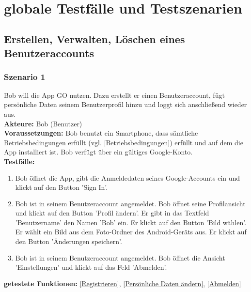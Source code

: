 \documentclass[parskip=full]{scrartcl}
\def\threedigits#1{%
  \ifnum#1<100 0\fi
  \ifnum#1<10 0\fi
  \number#1}
\begin{document}

\newpage
\section{globale Testfälle und Testszenarien}

\subsection{Erstellen, Verwalten, Löschen eines Benutzeraccounts}

\subsubsection*{Szenario 1}Bob will die App GO nutzen. Dazu erstellt er einen Benutzeraccount, fügt persönliche Daten seinem Benutzerprofil hinzu und loggt sich anschließend wieder aus.\\

\textbf{Akteure:} Bob (Benutzer) \\

\textbf{Voraussetzungen: }Bob benutzt ein Smartphone, dass sämtliche Betriebsbedingungen erfüllt (vgl. \ref{Betriebsbedingungen}) erfüllt und auf dem die App installiert ist. Bob verfügt über ein gültiges Google-Konto.\\

\textbf{Testfälle:}
\begin{enumerate}[label={\textbf{/T\protect\threedigits{\theenumi}0/}}, leftmargin=*]
	\item\label{Registrieren-Test} Bob öffnet die App, gibt die Anmeldedaten seines Google-Accounts ein und klickt auf den Button 'Sign In'.
	\item Bob ist in seinem Benutzeraccount angemeldet. Bob öffnet seine Profilansicht und klickt auf den Button 'Profil ändern'. Er gibt in das Textfeld 'Benutzername' den Namen 'Bob' ein. Er klickt auf den Button 'Bild wählen'. Er wählt ein Bild aus dem Foto-Ordner des Android-Geräts aus. Er klickt auf den Button 'Änderungen speichern'.
	\item Bob ist in seinem Benutzeraccount angemeldet. Bob öffnet die Ansicht 'Einstellungen' und klickt auf das Feld 'Abmelden'.
\end{enumerate}

\textbf{getestete Funktionen: }\ref{Registrieren}, \ref{Persönliche Daten ändern}, \ref{Abmelden}
\end{document}
